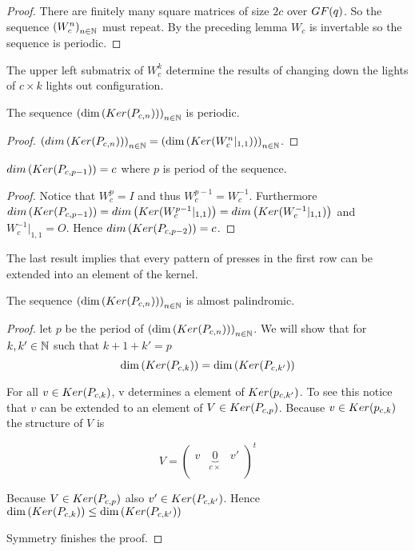 \begin{proof}
  There are finitely many square matrices of size $2c$ over
  $GF(q)$. So the sequence $\left(W_{c}^{n}\right)_{n\in\mathbb{N}}$ must
  repeat. By the preceding lemma $W_{c}$ is invertable so the
  sequence is periodic.
\end{proof}

The upper left submatrix of $W_{c}^{k}$ determine the results of
changing down the lights of $c \times k$ lights out configuration.

\begin{corollary}
  The sequence $\left(\dim\left(Ker(P_{c,n})\right)\right)_{n\in\mathbb{N}}$
  is periodic.
\end{corollary}

\begin{proof}
  $\left(dim\left(Ker(P_{c,n})\right)\right)_{n\in\mathbb{N}} = \left(\dim\left(Ker(W_{c}^{n}|_{1,1})\right)\right)_{n\in\mathbb{N}}$.
\end{proof}

\begin{lemma}
  $dim\left(Ker(P_{c,p-1})\right) = c$ where $p$ is period of the sequence. 
\end{lemma}

\begin{proof}
  Notice that $W_{c}^{p} = I$ and thus $W_{c}^{p-1} =  W_{c}^{-1}$.
  Furthermore $dim\left(Ker(P_{c,p-1})\right) =
  dim\left(Ker(W_{c}^{p-1}|_{1,1})\right) =
  dim\left(Ker(W_{c}^{-1}|_{1,1})\right)$ and $W_{c}^{-1}|_{1,1} = O$. 
  Hence $dim\left(Ker(P_{c,p-2})\right) = c$.
\end{proof}

The last result implies that every pattern of presses in the first row
can be extended into an element of the kernel.

\begin{theorem}
  The sequence $\left(\dim\left(Ker(P_{c,n})\right)\right)_{n\in\mathbb{N}}$
  is almost palindromic.
\end{theorem}

\begin{proof}
  let $p$ be the period of
  $\left(\dim\left(Ker(P_{c,n})\right)\right)_{n\in\mathbb{N}}$. We will show
  that for $k,k'\in\mathbb{N}$ such that $k+1+k'=p$
  \[
  \dim\left(Ker(P_{c,k})\right) = \dim\left(Ker(P_{c,k'})\right)
  \]

  For all $v\in Ker(P_{c,k})$, v determines a element of
  $Ker(p_{c,k'})$. To see this notice that $v$ can be extended to an
  element of $V\in Ker(P_{c,p})$. Because $v\in Ker(p_{c,k})$ the
  structure of $V$ is
  
  \[
  V =
  \left(
  \begin{array}{ccc}
    v & \underbrace{0}_{c\times} & v' \\
  \end{array}
  \right)^{t}
  \]
  
  Because $V\in Ker(P_{c,p})$ also
  $v'\in Ker(P_{c,k'})$. Hence  $\dim\left(Ker(P_{c,k})\right) \le
  \dim\left(Ker(P_{c,k'})\right)$ 

  Symmetry finishes the proof.
\end{proof}
